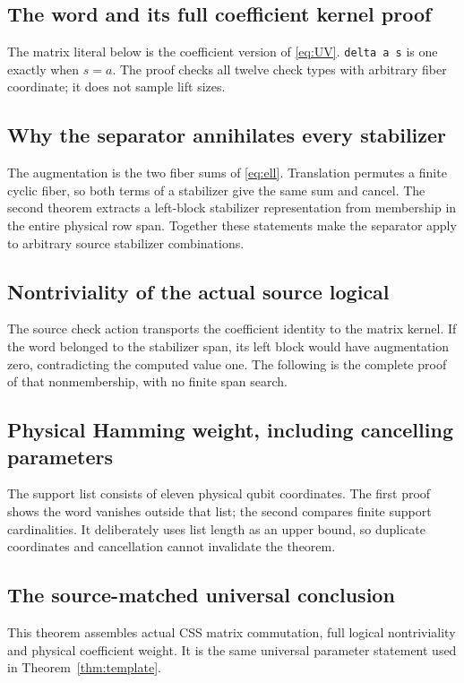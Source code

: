 \subsection{The word and its full coefficient kernel proof}
The matrix literal below is the coefficient version of \eqref{eq:UV}.
\texttt{delta a s} is one exactly when $s=a$. The proof checks all twelve
check types with arbitrary fiber coordinate; it does not sample lift sizes.

\subsection{Why the separator annihilates every stabilizer}
The augmentation is the two fiber sums of \eqref{eq:ell}. Translation permutes
a finite cyclic fiber, so both terms of a stabilizer give the same sum and
cancel. The second theorem extracts a left-block stabilizer representation
from membership in the entire physical row span. Together these statements
make the separator apply to arbitrary source stabilizer combinations.

\subsection{Nontriviality of the actual source logical}
The source check action transports the coefficient identity to the matrix
kernel. If the word belonged to the stabilizer span, its left block would
have augmentation zero, contradicting the computed value one. The following
is the complete proof of that nonmembership, with no finite span search.

\subsection{Physical Hamming weight, including cancelling parameters}
The support list consists of eleven physical qubit coordinates. The first
proof shows the word vanishes outside that list; the second compares finite
support cardinalities. It deliberately uses list length as an upper bound,
so duplicate coordinates and cancellation cannot invalidate the theorem.

\subsection{The source-matched universal conclusion}
This theorem assembles actual CSS matrix commutation, full logical
nontriviality and physical coefficient weight. It is the same universal
parameter statement used in Theorem~\ref{thm:template}.

